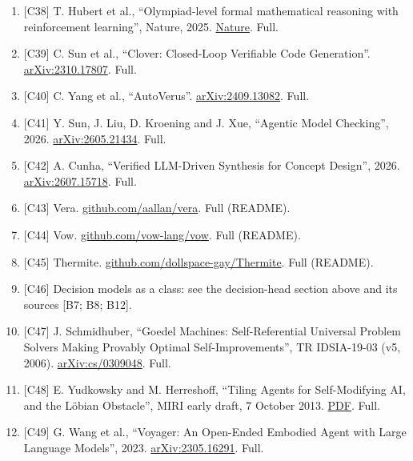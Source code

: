 \documentclass[10pt,letterpaper]{article}
\begin{document}
\begin{enumerate}
  {[}C37{]} A. Solar-Lezama, L. Tancau, R. Bodik, V. Saraswat and S.
  Seshia, ``Combinatorial Sketching for Finite Programs'', ASPLOS 2006.
  \href{https://people.csail.mit.edu/asolar/papers/asplos06-final.pdf}{PDF}.
  Full.
\item
  {[}C38{]} T. Hubert et al., ``Olympiad-level formal mathematical
  reasoning with reinforcement learning'', Nature, 2025.
  \href{https://www.nature.com/articles/s41586-025-09833-y}{Nature}.
  Full.
\item
  {[}C39{]} C. Sun et al., ``Clover: Closed-Loop Verifiable Code
  Generation''.
  \href{https://arxiv.org/abs/2310.17807}{arXiv:2310.17807}. Full.
\item
  {[}C40{]} C. Yang et al., ``AutoVerus''.
  \href{https://arxiv.org/abs/2409.13082}{arXiv:2409.13082}. Full.
\item
  {[}C41{]} Y. Sun, J. Liu, D. Kroening and J. Xue, ``Agentic Model
  Checking'', 2026.
  \href{https://arxiv.org/abs/2605.21434}{arXiv:2605.21434}. Full.
\item
  {[}C42{]} A. Cunha, ``Verified LLM-Driven Synthesis for Concept
  Design'', 2026.
  \href{https://arxiv.org/abs/2607.15718}{arXiv:2607.15718}. Full.
\item
  {[}C43{]} Vera.
  \href{https://github.com/aallan/vera}{github.com/aallan/vera}. Full
  (README).
\item
  {[}C44{]} Vow.
  \href{https://github.com/vow-lang/vow}{github.com/vow-lang/vow}. Full
  (README).
\item
  {[}C45{]} Thermite.
  \href{https://github.com/dollspace-gay/Thermite}{github.com/dollspace-gay/Thermite}.
  Full (README).
\item
  {[}C46{]} Decision models as a class: see the decision-head section
  above and its sources {[}B7; B8; B12{]}.
\item
  {[}C47{]} J. Schmidhuber, ``Goedel Machines: Self-Referential
  Universal Problem Solvers Making Provably Optimal Self-Improvements'',
  TR IDSIA-19-03 (v5, 2006).
  \href{https://arxiv.org/abs/cs/0309048}{arXiv:cs/0309048}. Full.
\item
  {[}C48{]} E. Yudkowsky and M. Herreshoff, ``Tiling Agents for
  Self-Modifying AI, and the Löbian Obstacle'', MIRI early draft, 7
  October 2013.
  \href{https://intelligence.org/files/TilingAgentsDraft.pdf}{PDF}.
  Full.
\item
  {[}C49{]} G. Wang et al., ``Voyager: An Open-Ended Embodied Agent with
  Large Language Models'', 2023.
  \href{https://arxiv.org/abs/2305.16291}{arXiv:2305.16291}. Full.

\end{enumerate}
\end{document}
